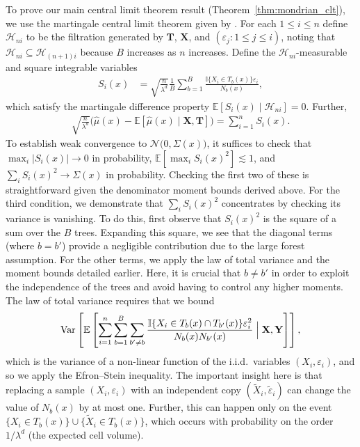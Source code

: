 \documentclass[11pt,lof]{puthesis}
\newcommand{\E}{\ensuremath{\mathbb{E}}}
\newcommand{\I}{\ensuremath{\mathbb{I}}}
\newcommand{\bY}{\ensuremath{\mathbf{Y}}}
\newcommand{\bX}{\ensuremath{\mathbf{X}}}
\newcommand{\bT}{\ensuremath{\mathbf{T}}}
\newcommand{\cH}{\ensuremath{\mathcal{H}}}
\newcommand{\cN}{\ensuremath{\mathcal{N}}}
\DeclareMathOperator{\Var}{Var}
\theoremstyle{break}
\theoremstyle{proof}
\begin{document}
To prove our main central limit theorem result
(Theorem~\ref{thm:mondrian_clt}), we use
the martingale central limit theorem given by
\citet[Theorem~3.2]{hall1980martingale}. For each $1 \leq i \leq n$ define
$\cH_{n i}$ to be the filtration generated by $\bT$, $\bX$, and
$(\varepsilon_j : 1 \leq j \leq i)$, noting that
$\cH_{n i} \subseteq \cH_{(n+1)i}$ because $B$ increases as $n$ increases.
Define the $\cH_{n i}$-measurable and square integrable variables
%
\begin{align*}
  S_i(x) &=
  \sqrt{\frac{n}{\lambda^d}} \frac{1}{B} \sum_{b=1}^B
  \frac{\I \{X_i \in T_b(x)\} \varepsilon_i} {N_{b}(x)},
\end{align*}
%
which satisfy the martingale difference property
$\E [ S_i(x) \mid \cH_{n i} ] = 0$. Further,
%
\begin{align*}
  \sqrt{\frac{n}{\lambda^d}}
  \big(
    \hat\mu(x)
    - \E\left[
      \hat\mu(x) \mid \bX, \bT
    \right]
  \big)
  = \sum_{i=1}^n S_i(x).
\end{align*}
%
To establish weak convergence to $\cN\big(0, \Sigma(x)\big)$,
it suffices to check that $\max_i |S_i(x)| \to 0$ in probability,
$\E\left[\max_i S_i(x)^2\right] \lesssim 1$,
and $\sum_i S_i(x)^2 \to \Sigma(x)$ in probability.
Checking the first two of these is straightforward given the denominator moment
bounds derived above. For the third condition, we demonstrate that
$\sum_i S_i(x)^2$ concentrates by checking its variance is vanishing. To do
this, first observe that $S_i(x)^2$ is the square of a sum over the $B$ trees.
Expanding this square, we see that the diagonal terms (where $b = b'$) provide
a negligible contribution due to the large forest assumption. For the other
terms, we apply the law of total variance and the moment bounds detailed
earlier. Here, it is crucial that $b \neq b'$ in order to exploit the
independence of the trees and avoid having to control any higher moments. The
law of total variance requires that we bound
%
\begin{align*}
  \Var \left[
    \E \left[
      \sum_{i=1}^n \sum_{b=1}^B \sum_{b' \neq b}
      \frac{\I\{X_i \in T_b(x) \cap T_{b'}(x)\} \varepsilon_i^2}
      {N_{b}(x) N_{b'}(x)} \Bigm| \bX, \bY
    \right]
  \right],
\end{align*}
%
which is the variance of a non-linear function of the i.i.d.\ variables
$(X_i, \varepsilon_i)$, and so we apply the Efron--Stein inequality.
The important insight here is that replacing a sample
$(X_i, \varepsilon_i)$ with an independent copy
$(\tilde X_i, \tilde \varepsilon_i)$ can change the value of
$N_b(x)$ by at most one. Further, this can happen only on the event
$\{ X_i \in T_{b}(x) \} \cup \{ \tilde X_i \in T_{b}(x) \}$,
which occurs with probability on the order $1/\lambda^d$
(the expected cell volume).
\end{document}
